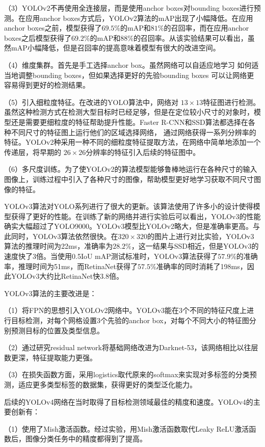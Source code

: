 （3）YOLOv2不再使用全连接层，而是使用anchor boxes对bounding boxes进行预测。在应用anchor boxes方式后，YOLOv2算法的mAP出现了小幅降低。在应用anchor boxes之前，模型获得了$69.5\%$的mAP和$81\%$的召回率，而在应用anchor boxes之后模型获得了$69.2\%$的mAP和$88\%$的召回率。从该实验结果可以看出，虽然mAP小幅降低，但是召回率的提高意味着模型有很大的改进空间。

（4）维度集群。首先是手工选择anchor box。虽然网络可以自适应地学习
如何适当地调整bounding boxes，但如果选择更好的先验bounding boxes
可以让网络更容易得到更好的检测结果。

（5）引入细粒度特征。在改进的YOLO算法中，网络对
$13\times13$特征图进行检测。虽然这种检测方式在检测大型目标时已经足够，但是在定位较小尺寸的对象时，模型还是需要更细粒度的特征帮助提升性能。Faster R-CNN和SSD算法都选择在各种不同尺寸的特征图上运行他们的区域选择网络，
通过网络获得一系列分辨率的特征。YOLOv2种采用一种不同的细粒度特征提取方法，在网络中简单地添加一个传递层，将早期的
$26\times26$分辨率的特征引入后续的特征图中。

（6）多尺度训练。为了使YOLOv2的算法模型能够鲁棒地运行在各种尺寸的输入图像上，训练过程中引入了各种尺寸的图像，帮助模型更好地学习获取不同尺寸图像的特征。

YOLOv3算法对YOLO系列进行了很大的更新。该算法使用了许多小的设计使得模型获得了更好的性能。在训练了新的网络并进行实验后可以看出，YOLOv3的性能确实大幅超过了YOLO9000。YOLOv3模型比YOLOv2略大，但是准确率更高。与此同时，YOLOv3算法依然很快。在$320\times320$的图片上进行对比实验，YOLOv3算法的推理时间为22ms，准确率为$28.2\%$，这一结果与SSD相近，但是YOLOv3的速度快了3倍。当使用0.5IoU mAP测试标准时，YOLOv3算法获得了$57.9\%$的准确率，推理时间为51ms，而RetinaNet获得了$57.5\%$准确率的同时消耗了198ms，因此YOLOv3大约比RetinaNet快3.8倍。

YOLOv3算法的主要改进是：

（1）将FPN的思想引入YOLOv2网络中。YOLOv3能在3个不同的特征尺度上进行目标检测，对每个网格设置3个先验的anchor box，对每个不同大小的特征图分别预测目标的位置及类型信息。

（2）通过研究residual network将基础网络改进为Darknet-53，该网络相比以往层数更深，特征提取能力更强。

（3）在损失函数方面，采用logistics取代原来的softmax来实现对多标签的分类预测，适应更多类型标签的数据集，获得更好的类型泛化能力。

后续的YOLOv4网络在当时取得了目标检测领域最佳的精度和速度。YOLOv4的主要创新有：

（1）使用了Mish激活函数。经过实验，用Mish激活函数取代Leaky ReLU激活函数后，图像分类任务中的精度都得到了提高。

